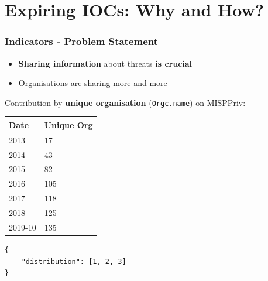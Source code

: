 
\begin{frame}[t,plain]
\titlepage
\end{frame}

\section{Expiring IOCs: Why and How?}
\begin{frame}[fragile]
\frametitle{Indicators - Problem Statement}
    \begin{itemize}
        \item {\bf Sharing information} about threats {\bf is crucial}
        \item Organisations are sharing more and more
    \end{itemize}
    \vspace{1em}

    Contribution by {\bf unique organisation} (\texttt{Orgc.name}) on MISPPriv:\\
    \vspace{1em}
    \begin{minipage}{0.45\textwidth}
        \begin{tabular}{ll}
            \hline
            Date  & Unique Org \\
            \hline
            2013  & 17 \\
            2014  & 43 \\
            2015  & 82 \\
            2016  & 105 \\
            2017  & 118 \\
            2018  & 125 \\
            2019-10 & 135 \\
            \hline
        \end{tabular}
        \vspace{0.5em}
    \end{minipage}
    \begin{minipage}{0.5\textwidth}
        \begin{lstlisting}
{
    "distribution": [1, 2, 3]
}\end{lstlisting}
    \end{minipage}

\end{frame}

